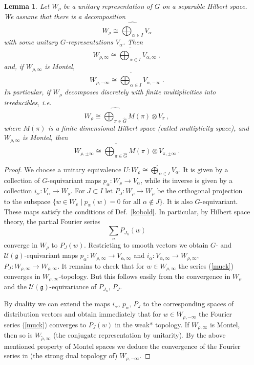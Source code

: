\documentclass[10]{amsart}
\newtheorem{lem}[thm]{Lemma}
\theoremstyle{remark}
\theoremstyle{definition}
\numberwithin{equation}{section}
\newcommand{\fg}{{\mathfrak g}}
\newcommand{\Cal}{\mathcal}
\newcommand{\be}{\begin{equation}}
\begin{document}
{\begin{lem}\label{deko}
Let $W_\rho$ be a unitary representation of $G$ on a separable Hilbert space. We assume that there is a decomposition
$$  W_\rho\cong \widehat{\bigoplus_{\alpha \in I}} V_\alpha$$
with some unitary $G$-representations  $V_\alpha$. Then
$$  W_{\rho,\infty}\cong \overline{\bigoplus_{\alpha \in I}} V_{\alpha,\infty}\ ,$$
and, if $W_{\rho,\infty}$ is Montel,
$$  W_{\rho,-\infty}\cong \overline{\bigoplus_{\alpha \in I}} V_{\alpha,-\infty}\ .$$
In particular, if   $W_\rho$
decomposes discretely with finite multiplicities into irreducibles, i.e.
$$  W_\rho\cong \widehat{\bigoplus_{\pi\in\hat G}}M(\pi)\otimes V_\pi\ ,$$
where $M(\pi)$ is a finite dimensional Hilbert space (called multiplicity space), and $W_{\rho,\infty}$ is Montel, then
$$  W_{\rho,\pm\infty}\cong \overline{\bigoplus_{\pi\in\hat G}}M(\pi)\otimes V_{\pi,\pm\infty}\ .$$
\end{lem}
\begin{proof} We choose a unitary equivalence $U: W_\rho\cong \widehat{\bigoplus}_{\alpha \in I} V_\alpha$. It is given
by a collection of $G$-equivariant maps $p_\alpha: W_\rho\rightarrow V_\alpha$, while its inverse is given by a collection $i_\alpha:  V_\alpha\rightarrow W_\rho$.
For $J\subset I$ let $P_J: W_\rho\rightarrow W_\rho$ be the orthogonal projection to the subspace $\{w\in W_\rho\mid p_\alpha(w)=0\mbox{ for all }\alpha\not\in J\}$. It is also
$G$-equivariant.
These maps satisfy the conditions of Def.~\ref{kobold}. In particular, by Hilbert space theory, the partial Fourier series
\be\label{muck} \sum_n P_{J_n}(w) 
\end{equation}
converge in $W_\rho$ to  $P_J(w)$. Restricting to smooth vectors we obtain $G$- and $ {\Cal U}(\fg)$-equivariant maps $p_\alpha: W_{\rho,\infty}\rightarrow  V_{\alpha,\infty}$ and
$i_\alpha: V_{\alpha,\infty} \rightarrow W_{\rho,\infty}$, $P_J: W_{\rho,\infty}\rightarrow W_{\rho,\infty}$. It remains to check that for $w\in W_{\rho,\infty}$  the series (\ref{muck}) converges in $W_{\rho,\infty}$-topology. But this
follows easily from the convergence in  $W_\rho$ and the  ${\Cal U}(\fg)$-equivariance of $ P_{J_n}$, $P_J$.

By duality we can extend the maps $i_\alpha$, $p_\alpha$, $P_J$ to the corresponding spaces of distribution vectors and obtain immediately that for $w\in W_{\rho,-\infty}$ the Fourier
series (\ref{muck}) converges to $P_J(w)$ in the weak* topology. If $W_{\rho,\infty}$ is Montel, then so is $W_{\tilde\rho,\infty}$ (the conjugate representation by unitarity). By the above mentioned
property of Montel spaces we deduce the convergence of the Fourier series in (the strong dual topology of)  $W_{\rho,-\infty}$.
\end{proof}

}
\end{document}
